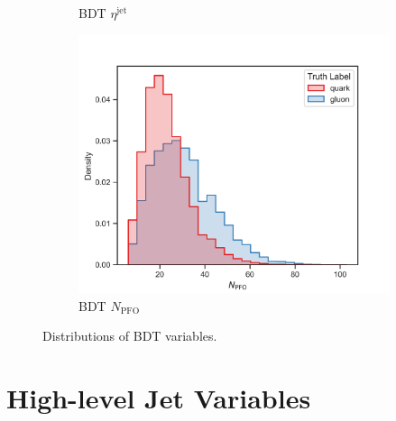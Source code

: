\begin{figure}[!htb]
\begin{subfigure}[t]{0.49\textwidth}
        \caption{BDT $\eta^{\mathrm{jet}}$}
        \label{fig:app_bdt_eta_jet}
    \end{subfigure}
    \begin{subfigure}[t]{0.49\textwidth}
        \includegraphics[width=\linewidth]{src/plots/distributions/BDT/N_PFO.png}
        \caption{BDT $N_{\mathrm{PFO}}$}
        \label{fig:app_bdt_N_PFO}
    \end{subfigure}
\caption{Distributions of BDT variables.}
\label{fig:app_bdt_variables}
\end{figure}

\FloatBarrier

\section{High-level Jet Variables}
\label{sec:app_high_level_variables}


